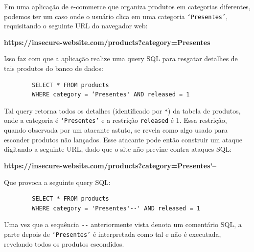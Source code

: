 \begin{alineas}
    \item
    Em uma aplicação de e-commerce que organiza produtos em categorias diferentes, podemos ter um caso onde o usuário clica em uma categoria \verb+‘Presentes’+, requisitando o seguinte URL do navegador web:
    
    \textbf{https://insecure-website.com/products?category=Presentes}
    
    Isso faz com que a aplicação realize uma query SQL para resgatar detalhes de tais produtos do banco de dados:
    
    \begin{verbatim}
        SELECT * FROM products
        WHERE category = ‘Presentes' AND released = 1 
    \end{verbatim}
    
    Tal query retorna todos os detalhes (identificado por \verb+*+) da tabela de produtos, onde a categoria é \verb+‘Presentes’+ e a restrição \verb+released+ é 1. Essa restrição, quando observada por um atacante astuto, se revela como algo usado para esconder produtos não lançados. Esse atacante pode então construir um ataque digitando a seguinte URL, dado que o site não previne contra ataques SQL:
        
    \textbf{https://insecure-website.com/products?category=Presentes’--}
    
    Que provoca a seguinte query SQL:
    
    \begin{verbatim}
        SELECT * FROM products 
        WHERE category = 'Presentes'--' AND released = 1 
    \end{verbatim}
    
     Uma vez que a sequência \verb+--+ anteriormente vista denota um comentário SQL, a parte depois de 
    \verb+‘Presentes’+ é interpretada como tal e não é executada, revelando todos os produtos escondidos.

\end{alineas}

